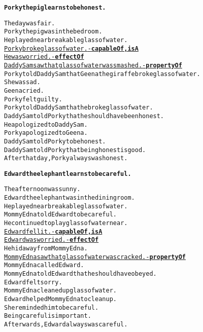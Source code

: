 \begin{alltt}
\textbf{Porky the pig learns to be honest.}

The day was fair.
Porky the pig was in the bedroom.
He played near breakable glass of water.
\underline{Porky broke glass of water. - \textbf{capableOf, isA}}
\underline{He was worried. - \textbf{effectOf}}
\underline{Daddy Sam saw that glass of water was smashed. - \textbf{propertyOf}}
Porky told Daddy Sam that Geena the giraffe broke glass of water.
She was sad.
Geena cried.
Porky felt guilty.
Porky told Daddy Sam that he broke glass of water.
Daddy Sam told Porky that he should have been honest.
He apologized to Daddy Sam.
Porky apologized to Geena.
Daddy Sam told Porky to be honest.
Daddy Sam told Porky that being honest is good.
After that day, Porky always was honest.
\end{alltt}

\begin{alltt}
\textbf{Edward the elephant learns to be careful.}

The afternoon was sunny.
Edward the elephant was in the dining room.
He played near breakable glass of water.
Mommy Edna told Edward to be careful.
He continued to play glass of water near.
\underline{Edward fell it. - \textbf{capableOf, isA}}
\underline{Edward was worried. - \textbf{effectOf}}
He hid away from Mommy Edna.
\underline{Mommy Edna saw that glass of water was cracked. - \textbf{propertyOf}}
Mommy Edna called Edward.
Mommy Edna told Edward that he should have obeyed.
Edward felt sorry.
Mommy Edna cleaned up glass of water.
Edward helped Mommy Edna to clean up.
She reminded him to be careful.
Being careful is important.
Afterwards, Edward always was careful.
\end{alltt}

